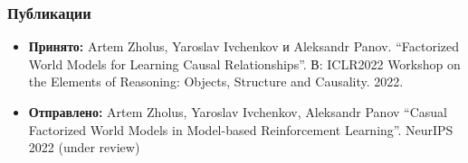 \begin{frame}
\frametitle{Публикации}
\begin{itemize}
    \item \textbf{Принято:} Artem Zholus, Yaroslav Ivchenkov и Aleksandr Panov.
“Factorized World Models for Learning Causal Relationships”. В: ICLR2022
Workshop on the Elements of Reasoning: Objects, Structure and
Causality. 2022. 
    \item \textbf{Отправлено:} Artem Zholus, Yaroslav Ivchenkov, Aleksandr Panov ``Casual Factorized World Models in Model-based Reinforcement Learning''. NeurIPS 2022 (under review)
\end{itemize}

\end{frame}